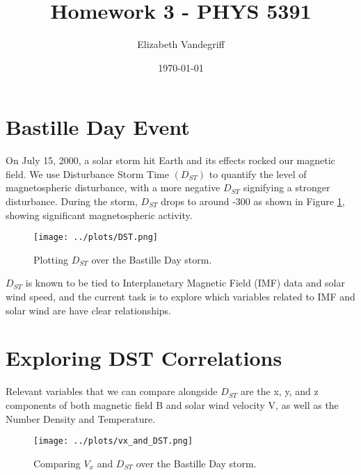 \documentclass[12pt, letterpaper]{article}
\begin{document}
\title{Homework 3 - PHYS 5391}
\author{Elizabeth Vandegriff}
\date{\today}

\maketitle
\newpage
\tableofcontents
\newpage

\section{Bastille Day Event}

On July 15, 2000, a solar storm hit Earth and its effects rocked our magnetic field. We use Disturbance Storm Time $(D_{ST})$ to quantify the level of magnetospheric disturbance, with a more negative $D_{ST}$ signifying a stronger disturbance. During the storm, $D_{ST}$ drops to around -300 as shown in Figure \ref{fig:dst}, showing significant magnetospheric activity.

\begin{figure}[!ht]
  \centering
  \texttt{[image: ../plots/DST.png]}
  \caption{Plotting $D_{ST}$ over the Bastille Day storm.}
  \label{fig:dst}
\end{figure}

$D_{ST}$ is known to be tied to Interplanetary Magnetic Field (IMF) data and solar wind speed, and the current task is to explore which variables related to IMF and solar wind are have clear relationships.

\section{Exploring DST Correlations}

Relevant variables that we can compare alongside $D_{ST}$ are the x, y, and z components of both magnetic field B and solar wind velocity V, as well as the Number Density and Temperature.


\clearpage

\begin{figure}[!ht]
  \centering
  \texttt{[image: ../plots/vx\_and\_DST.png]}
  \caption{Comparing $V_{x}$ and $D_{ST}$ over the Bastille Day storm.}
  \label{fig:vx}
\end{figure}
\end{document}
